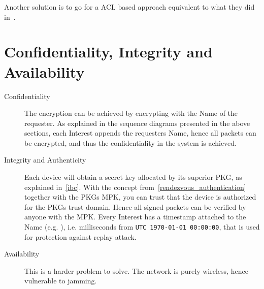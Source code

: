 Another solution is to go for a \gls{ACL} based approach equivalent to what they did in~\cite{DBLP:journals/network/ShangDMBZ14}.

\section{Confidentiality, Integrity and Availability}

\begin{description}
  \item[Confidentiality] 
  The encryption can be achieved by encrypting with the Name of the requester.
  As explained in the sequence diagrams presented in the above sections, each Interest appends the requesters Name, hence all packets can be encrypted, and thus the confidentiality in the system is achieved.
  \item[Integrity and Authenticity]
  Each device will obtain a secret key allocated by its superior \gls{PKG}, as explained in~\autoref{ibc}.
  With the concept from~\autoref{rendezvous_authentication} together with the \gls{PKG}s \gls{MPK}, you can trust that the device is authorized for the \gls{PKG}s trust domain. Hence all signed packets can be verified by anyone with the \gls{MPK}.
  Every Interest has a timestamp attached to the Name (e.g. ), i.e. milliseconds from \texttt{UTC 1970-01-01 00:00:00}, that is used for protection against replay attack. 
  \item[Availability]
  This is a harder problem to solve.
  The network is purely wireless, hence vulnerable to jamming. 
\end{description}